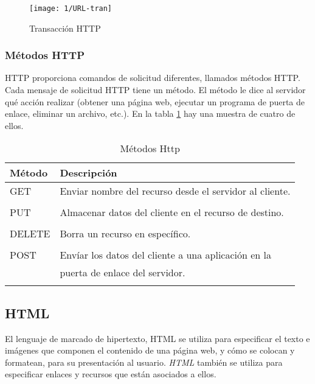 	\begin{figure} %
		\texttt{[image: 1/URL-tran]}
		\caption{Transacción HTTP }
		\label{fig:URL-tran}
	\end{figure}
	
	\subsubsection{Métodos HTTP}  
         HTTP proporciona  comandos de solicitud diferentes, llamados métodos HTTP. Cada mensaje de solicitud HTTP tiene un método. El método le dice al servidor qué acción realizar (obtener una página web, ejecutar un programa de puerta de enlace, eliminar un archivo, etc.). En la tabla \ref{tab:met-Http} hay una muestra de cuatro de ellos.

\begin{table}[H]
	\footnotesize%
	\begin{center}
		\footnotesize
		\begin{tabular}{ll}
			\toprule
			Método    &  Descripción    \\
			\midrule
			\quad GET  & Enviar nombre del recurso desde el servidor al cliente. \\  \\		\quad PUT  &  Almacenar datos del cliente en el recurso de destino. \\ \\	
			\quad DELETE & Borra  un recurso en específico. \\  \\	
			\quad POST & Envíar los datos del cliente a una aplicación en la \\ 
			\quad & puerta de enlace del servidor. \\				 
			\addlinespace 
			\bottomrule
		\end{tabular}
	\end{center}
	\caption{Métodos Http }
	\label{tab:met-Http}
\end{table}

\subsection{HTML}  
El lenguaje de marcado de hipertexto, \gls{HTML} se utiliza para especificar el texto e imágenes que componen el contenido de una página web, y  cómo se colocan y formatean,  para su presentación al usuario. \textit{HTML} también se utiliza para especificar enlaces y  recursos que están asociados a ellos. 

